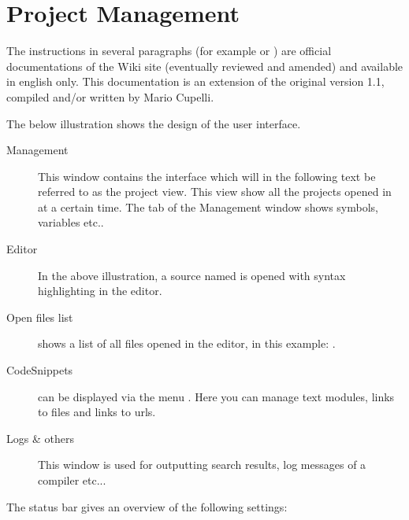 \chapter{\codeblocks Project Management}

The instructions in several paragraphs (for example  or ) are official documentations of the \codeblocks Wiki site (eventually reviewed and amended) and available in english only.
This documentation is an extension of the original version 1.1, compiled and/or written by Mario Cupelli.

The below illustration shows the design of the \codeblocks user interface.


\begin{description}
\item[Management] This window contains the interface  which will in the following text be referred to as the project view. This view show all the projects opened in \codeblocks at a certain time. The  tab of the Management window shows symbols, variables etc..
\item[Editor] In the above illustration, a source named  is opened with syntax highlighting in the editor.
\item[Open files list] shows a list of all files opened in the editor, in this example: .
\item[CodeSnippets] can be displayed via the menu . Here you can manage text modules, links to files and links to urls.
\item[Logs \& others] This window is used for outputting search results, log messages of a compiler etc...
\end{description}

The status bar gives an overview of the following settings:

